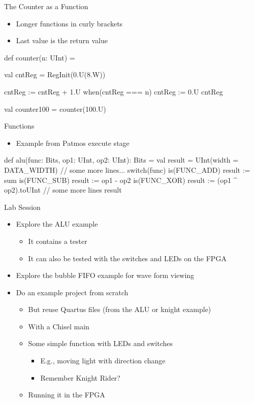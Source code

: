 \documentclass[xcolor=pdflatex,dvipsnames,table]{beamer}
\begin{document}
\begin{frame}[fragile]{The Counter as a Function}
\begin{itemize}
\item Longer functions in curly brackets
\item Last value is the return value
\end{itemize}
\begin{chisel}
def counter(n: UInt) = {
  
  val cntReg = RegInit(0.U(8.W))
  
  cntReg := cntReg + 1.U
  when(cntReg === n) {
    cntReg := 0.U
  }
  cntReg
}

val counter100 = counter(100.U)
\end{chisel}
\end{frame}


\begin{frame}[fragile]{Functions}
\begin{itemize}
\item Example from Patmos execute stage
\end{itemize}
\begin{chisel}
def alu(func: Bits, op1: UInt, op2: UInt): Bits = {
  val result = UInt(width = DATA_WIDTH)
  // some more lines...
  switch(func) {
    is(FUNC_ADD) { result := sum }
    is(FUNC_SUB) { result := op1 - op2 }
    is(FUNC_XOR) { result := (op1 ^ op2).toUInt }
    // some more lines
  }
  result
}
\end{chisel}
\end{frame}

\begin{frame}[fragile]{Lab Session}
\begin{itemize}
\item Explore the ALU example
\begin{itemize}
\item It contains a tester
\item It can also be tested with the switches and LEDs on the FPGA
\end{itemize}
\item Explore the bubble FIFO example for wave form viewing
\item Do an example project from scratch
\begin{itemize}
\item But reuse Quartus files (from the ALU or knight example)
\item With a Chisel main
\item Some simple function with LEDs and switches
\begin{itemize}
\item E.g., moving light with direction change
\item Remember Knight Rider?
\end{itemize}
\item Running it in the FPGA
\end{itemize}
\end{itemize}
\end{frame}
\end{document}
